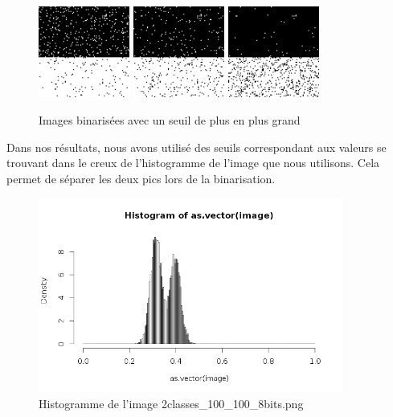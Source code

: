 \documentclass[a4paper,11pt]{article}
\begin{document}
  \begin{figure}[H]
    \center
    \includegraphics[width=3cm]{resultat/bin35.png}
    \includegraphics[width=3cm]{resultat/bin36.png}
    \includegraphics[width=3cm]{resultat/bin37.png}
    \caption{Images binarisées avec un seuil de plus en plus grand}
  \end{figure}
  
  Dans nos résultats, nous avons utilisé des seuils correspondant aux valeurs se trouvant dans le creux
  de l'histogramme de l'image que nous utilisons. Cela permet de séparer les deux pics lors de la 
  binarisation.\\
  
  \begin{figure}[H]
    \center
    \includegraphics[width=10cm]{resultat/hist_image_principal.png}
    \caption{Histogramme de l'image 2classes\_100\_100\_8bits.png}
  \end{figure}
  
\end{document}
